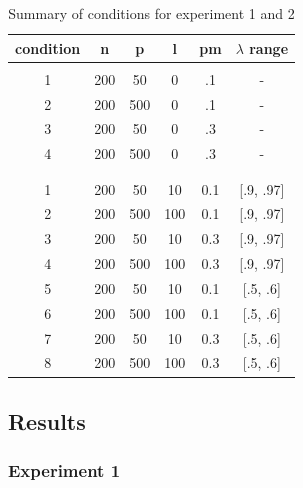 \begin{table}[t]
   \begin{center}
        \begin{tabular}{ c c c c c c }
		\textbf{condition} & \textbf{n} & \textbf{p} & \textbf{l} & \textbf{pm} & \textbf{$\lambda$ range} \\ 
		\hline

		\rowcolor{Gray}
 		\multicolumn{6}{c}{Experiment 1} \\
		\hline

		1 & 200 & 50 & 0 & .1 & - \\
		2 & 200 & 500 & 0 & .1 & - \\
		3 & 200 & 50 & 0 & .3 & - \\
		4 & 200 & 500 & 0 & .3 & - \\
	\hline
		& & & & & \\ 

		\rowcolor{Gray}
 		\multicolumn{6}{c}{Experiment 2} \\
		\hline

  1 & 200 & 50 &  10 &  0.1 & [.9, .97] \\
  2 & 200 & 500 & 100 & 0.1 & [.9, .97] \\
  3 & 200 & 50 &  10 &  0.3 & [.9, .97] \\
  4 & 200 & 500 & 100 & 0.3 & [.9, .97] \\
  5 & 200 & 50 &  10 &  0.1 & [.5, .6]  \\
  6 & 200 & 500 & 100 & 0.1 & [.5, .6]  \\
  7 & 200 & 50 &  10 &  0.3 & [.5, .6]  \\
  8 & 200 & 500 & 100 & 0.3 & [.5, .6]  \\

		\hline
        \end{tabular}
    \end{center}
\caption{Summary of conditions for experiment 1 and 2}
\label{table:condSum}
\end{table}


\FloatBarrier %

\subsection{Results}

\subsubsection{Experiment 1}

